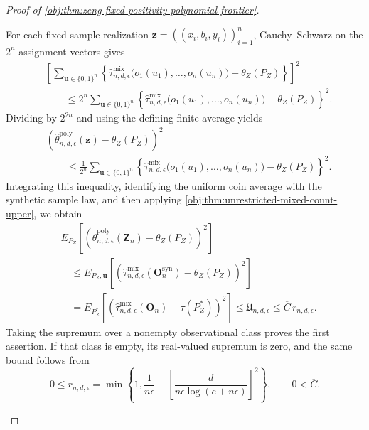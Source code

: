 \documentclass[11pt]{article}
\begin{document}
\begin{proof}[Proof of \cref{obj:thm:zeng-fixed-positivity-polynomial-frontier}]
\begin{enumerate}
For each fixed sample realization
\(\mathbf z=((x_i,b_i,y_i))_{i=1}^n\), Cauchy--Schwarz on the
\(2^n\) assignment vectors gives
\[
\begin{split}
&\left[
\sum_{\mathbf u\in\{0,1\}^n}
\left\{
\widehat\tau^{\mathrm{mix}}_{n,d,\epsilon}
\bigl(o_1(u_1),\ldots,o_n(u_n)\bigr)
-\theta_Z(P_Z)
\right\}
\right]^2\\
&\qquad\le
2^n\sum_{\mathbf u\in\{0,1\}^n}
\left\{
\widehat\tau^{\mathrm{mix}}_{n,d,\epsilon}
\bigl(o_1(u_1),\ldots,o_n(u_n)\bigr)
-\theta_Z(P_Z)
\right\}^2.
\end{split}
\]
Dividing by \(2^{2n}\) and using the defining finite average yields
\[
\begin{split}
&\left(
\widehat\theta^{\mathrm{poly}}_{n,d,\epsilon}(\mathbf z)
-\theta_Z(P_Z)
\right)^2\\
&\qquad\le
\frac1{2^n}
\sum_{\mathbf u\in\{0,1\}^n}
\left\{
\widehat\tau^{\mathrm{mix}}_{n,d,\epsilon}
\bigl(o_1(u_1),\ldots,o_n(u_n)\bigr)
-\theta_Z(P_Z)
\right\}^2.
\end{split}
\]
Integrating this inequality, identifying the uniform coin average with
the synthetic sample law, and then applying
\cref{obj:thm:unrestricted-mixed-count-upper}, we obtain
\[
\begin{split}
&E_{P_Z}\!\left[
\left(
\widehat\theta^{\mathrm{poly}}_{n,d,\epsilon}(\mathbf Z_n)
-\theta_Z(P_Z)
\right)^2
\right]\\
&\quad\le
E_{P_Z,\mathbf u}\!\left[
\left(
\widehat\tau^{\mathrm{mix}}_{n,d,\epsilon}
(\mathbf O_n^{\mathrm{syn}})
-\theta_Z(P_Z)
\right)^2
\right]\\
&\quad=
E_{P_Z^*}\!\left[
\left(
\widehat\tau^{\mathrm{mix}}_{n,d,\epsilon}(\mathbf O_n)
-\tau(P_Z^*)
\right)^2
\right]
\le \mathfrak U_{n,d,\epsilon}
\le \overline C\,r_{n,d,\epsilon}.
\end{split}
\]
Taking the supremum over a nonempty observational class proves the
first assertion. If that class is empty, its real-valued supremum is
zero, and the same bound follows from
\[
0\le r_{n,d,\epsilon}
=
\min\left\{
1,\frac1{n\epsilon}
+\left[\frac d{n\epsilon\log(e+n\epsilon)}\right]^2
\right\},
\qquad
0<\overline C.
\]


\end{enumerate}
\end{proof}
\end{document}
